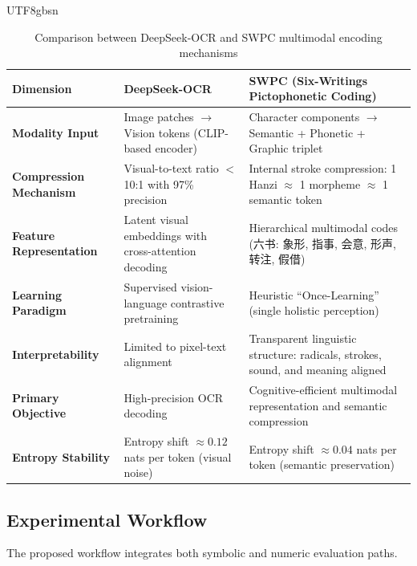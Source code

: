 \documentclass[conference]{IEEEtran}
\begin{document}
\begin{CJK*}{UTF8}{gbsn}
\begin{table}[htbp]
\centering
\caption{Comparison between DeepSeek-OCR \cite{wei2025deepseek} and SWPC multimodal encoding mechanisms \cite{weigang2024six}}
\label{tab:ocr_swpc_comparison}
\small
\begin{tabular}{p{3cm} p{5.2cm} p{7cm}}
\toprule
\textbf{Dimension} & \textbf{DeepSeek-OCR} & \textbf{SWPC (Six-Writings Pictophonetic Coding)} \\
\midrule
\textbf{Modality Input} &
Image patches $\rightarrow$ Vision tokens (CLIP-based encoder) &
Character components $\rightarrow$ Semantic + Phonetic + Graphic triplet \\
\textbf{Compression Mechanism} &
Visual-to-text ratio $<$ 10:1 with 97\% precision &
Internal stroke compression: 1 Hanzi $\approx$ 1 morpheme $\approx$ 1 semantic token \\
\textbf{Feature Representation} &
Latent visual embeddings with cross-attention decoding &
Hierarchical multimodal codes (六书: 象形, 指事, 会意, 形声, 转注, 假借) \\
\textbf{Learning Paradigm} &
Supervised vision-language contrastive pretraining &
Heuristic “Once-Learning” (single holistic perception) \citep{weigang1999study, weigang2022hol} \\
\textbf{Interpretability} &
Limited to pixel-text alignment &
Transparent linguistic structure: radicals, strokes, sound, and meaning aligned \\
\textbf{Primary Objective} &
High-precision OCR decoding &
Cognitive-efficient multimodal representation and semantic compression \\
\textbf{Entropy Stability} &
Entropy shift $\approx 0.12$ nats per token (visual noise) &
Entropy shift $\approx 0.04$ nats per token (semantic preservation) \\
\bottomrule
\end{tabular}
\end{table}

\subsection{Experimental Workflow}

The proposed workflow integrates both symbolic and numeric evaluation paths. %



\end{CJK*}
\end{document}
